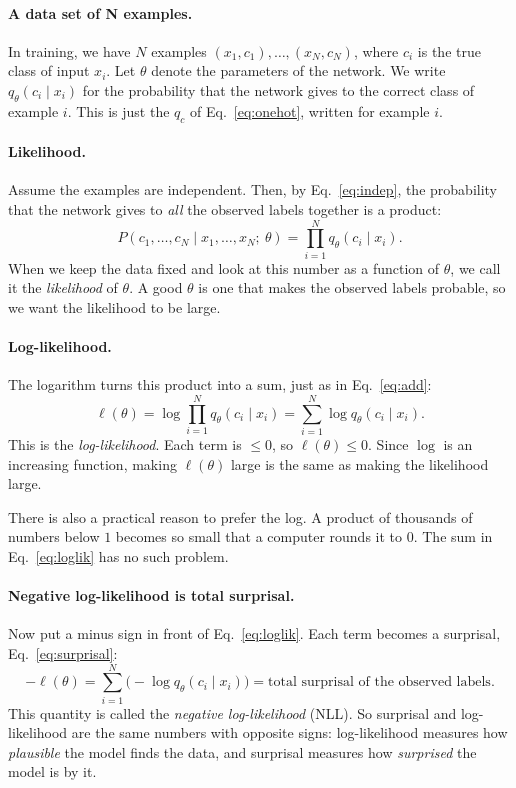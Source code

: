 \documentclass[12pt,a4paper]{article}
\begin{document}
\paragraph{A data set of N examples.}
In training, we have $N$
examples $(x_1, c_1), \dots, (x_N, c_N)$,
where $c_i$ is the true class of input
$x_i$. Let $\theta$ denote the parameters
of the network. We write
$q_\theta(c_i \mid x_i)$ for the probability
that the network gives to the correct class of
example $i$. This is just the $q_c$ of
Eq.~\eqref{eq:onehot}, written for example $i$.

\paragraph{Likelihood.}
Assume the examples are independent. Then, by
Eq.~\eqref{eq:indep}, the probability that the network
gives to \emph{all} the observed labels together is a
product:
\begin{equation}
  P(c_1, \dots, c_N \mid x_1, \dots, x_N;\ \theta)
  = \prod_{i=1}^{N} q_\theta(c_i \mid x_i).
  \label{eq:lik}
\end{equation}
When we keep the data fixed and look at this number as a
function of $\theta$, we call it the \emph{likelihood} of
$\theta$. A good $\theta$ is one that makes the observed
labels probable, so we want the likelihood to be large.

\paragraph{Log-likelihood.}
The logarithm turns this product into a sum, just as in
Eq.~\eqref{eq:add}:
\begin{equation}
  \ell(\theta) = \log \prod_{i=1}^{N} q_\theta(c_i \mid x_i)
  = \sum_{i=1}^{N} \log q_\theta(c_i \mid x_i).
  \label{eq:loglik}
\end{equation}
This is the \emph{log-likelihood}. Each term is $\le 0$, so
$\ell(\theta) \le 0$. Since $\log$ is an increasing
function, making $\ell(\theta)$ large is the same as making
the likelihood large.

There is also a practical reason to prefer the log. A
product of thousands of numbers below $1$ becomes so small
that a computer rounds it to $0$. The sum in
Eq.~\eqref{eq:loglik} has no such problem.

\paragraph{Negative log-likelihood is total surprisal.}
Now put a minus sign in front of Eq.~\eqref{eq:loglik}.
Each term becomes a surprisal, Eq.~\eqref{eq:surprisal}:
\begin{equation}
  -\ell(\theta)
  = \sum_{i=1}^{N} \big(-\log q_\theta(c_i \mid x_i)\big)
  = \text{total surprisal of the observed labels}.
  \label{eq:nll}
\end{equation}
This quantity is called the \emph{negative log-likelihood}
(NLL). So surprisal and log-likelihood are the same numbers
with opposite signs: log-likelihood measures how
\emph{plausible} the model finds the data, and surprisal
measures how \emph{surprised} the model is by it.
\end{document}
